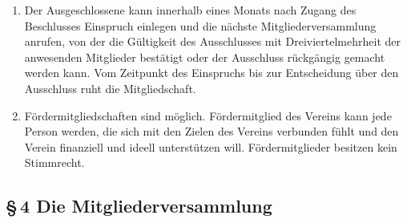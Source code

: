 \documentclass[12pt,a4paper]{article}
\begin{document}
\begin{enumerate}
\item Der Ausgeschlossene kann innerhalb eines Monats nach Zugang des Beschlusses Einspruch einlegen und die nächste Mitgliederversammlung anrufen, von der die Gültigkeit des Ausschlusses mit Dreiviertelmehrheit der anwesenden Mitglieder bestätigt oder der Ausschluss rückgängig gemacht werden kann. Vom Zeitpunkt des Einspruchs bis zur Entscheidung über den Ausschluss ruht die Mitgliedschaft.
\item Fördermitgliedschaften sind möglich. Fördermitglied des Vereins kann jede Person werden, die
sich mit den Zielen des Vereins verbunden fühlt und den Verein finanziell und ideell unterstützen
will. Fördermitglieder besitzen kein Stimmrecht.
\end{enumerate}

\subsection*{§\,4 Die Mitgliederversammlung}
\end{document}
